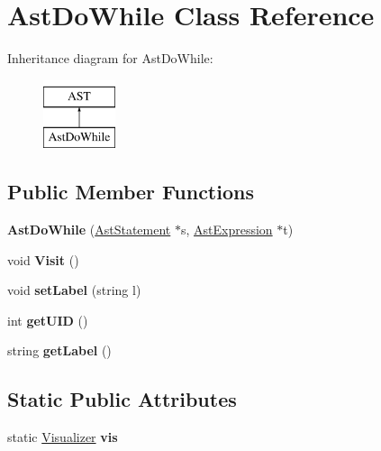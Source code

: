 \hypertarget{classAstDoWhile}{\section{Ast\-Do\-While Class Reference}
\label{classAstDoWhile}
}
Inheritance diagram for Ast\-Do\-While\-:\begin{figure}[H]
\begin{center}
\leavevmode
\includegraphics[height=2.000000cm]{classAstDoWhile}
\end{center}
\end{figure}
\subsection*{Public Member Functions}
\begin{DoxyCompactItemize}
\item 
\hypertarget{classAstDoWhile_a7a03e49e40bf03becd193a25be0302da}{{\bfseries Ast\-Do\-While} (\hyperlink{classAstStatement}{Ast\-Statement} $\ast$s, \hyperlink{classAstExpression}{Ast\-Expression} $\ast$t)}\label{classAstDoWhile_a7a03e49e40bf03becd193a25be0302da}

\item 
\hypertarget{classAstDoWhile_ae45111e771d2b16c5aef452cf37a629f}{void {\bfseries Visit} ()}\label{classAstDoWhile_ae45111e771d2b16c5aef452cf37a629f}

\item 
\hypertarget{classAST_a71d680856e95ff89f55d5311a552eba6}{void {\bfseries set\-Label} (string l)}\label{classAST_a71d680856e95ff89f55d5311a552eba6}

\item 
\hypertarget{classAST_ab7a5b1d9f1c2de0d98deb356f724a42c}{int {\bfseries get\-U\-I\-D} ()}\label{classAST_ab7a5b1d9f1c2de0d98deb356f724a42c}

\item 
\hypertarget{classAST_aee029be902fffc927d16ccb03eb922ad}{string {\bfseries get\-Label} ()}\label{classAST_aee029be902fffc927d16ccb03eb922ad}

\end{DoxyCompactItemize}
\subsection*{Static Public Attributes}
\begin{DoxyCompactItemize}
\item 
\hypertarget{classAST_aca9e6637209b31e03a09c0d42f29bdfa}{static \hyperlink{classVisualizer}{Visualizer} {\bfseries vis}}\label{classAST_aca9e6637209b31e03a09c0d42f29bdfa}

\end{DoxyCompactItemize}
